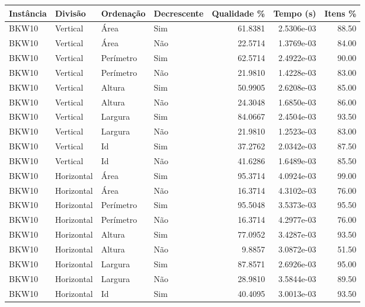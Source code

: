 \begin{tabular}{llllrrr}
\hline
Instância & Divisão     & Ordenação & Decrescente & Qualidade \% & Tempo (s)  & Itens \% \\
\hline
BKW10     & Vertical    & Área      & Sim         & 61.8381      & 2.5306e-03 & 88.50    \\
BKW10     & Vertical    & Área      & Não         & 22.5714      & 1.3769e-03 & 84.00    \\
BKW10     & Vertical    & Perímetro & Sim         & 62.5714      & 2.4922e-03 & 90.00    \\
BKW10     & Vertical    & Perímetro & Não         & 21.9810      & 1.4228e-03 & 83.00    \\
BKW10     & Vertical    & Altura    & Sim         & 50.9905      & 2.6208e-03 & 85.00    \\
BKW10     & Vertical    & Altura    & Não         & 24.3048      & 1.6850e-03 & 86.00    \\
BKW10     & Vertical    & Largura   & Sim         & 84.0667      & 2.4504e-03 & 93.50    \\
BKW10     & Vertical    & Largura   & Não         & 21.9810      & 1.2523e-03 & 83.00    \\
BKW10     & Vertical    & Id        & Sim         & 37.2762      & 2.0342e-03 & 87.50    \\
BKW10     & Vertical    & Id        & Não         & 41.6286      & 1.6489e-03 & 85.50    \\
BKW10     & Horizontal  & Área      & Sim         & 95.3714      & 4.0924e-03 & 99.00    \\
BKW10     & Horizontal  & Área      & Não         & 16.3714      & 4.3102e-03 & 76.00    \\
BKW10     & Horizontal  & Perímetro & Sim         & 95.5048      & 3.5373e-03 & 95.50    \\
BKW10     & Horizontal  & Perímetro & Não         & 16.3714      & 4.2977e-03 & 76.00    \\
BKW10     & Horizontal  & Altura    & Sim         & 77.0952      & 3.4287e-03 & 93.50    \\
BKW10     & Horizontal  & Altura    & Não         & 9.8857       & 3.0872e-03 & 51.50    \\
BKW10     & Horizontal  & Largura   & Sim         & 87.8571      & 2.6926e-03 & 95.00    \\
BKW10     & Horizontal  & Largura   & Não         & 28.9810      & 3.5844e-03 & 89.50    \\
BKW10     & Horizontal  & Id        & Sim         & 40.4095      & 3.0013e-03 & 93.50    \\

\end{tabular}

